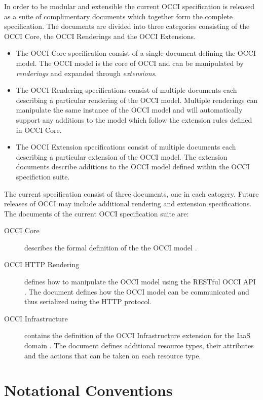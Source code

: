 \documentclass[10pt,a4paper,british]{article}
\begin{document}
In order to be modular and extensible the current OCCI specification is
released as a suite of complimentary documents which together form the complete
specification.
%
The documents are divided into three categories consisting of the OCCI Core,
the OCCI Renderings and the OCCI Extensions.
%
\begin{itemize}
\item The OCCI Core specification consist of a single document defining the
 OCCI model. The OCCI model is the core of OCCI and can be manipulated by {\em
 renderings} and expanded through {\em extensions}.
\item The OCCI Rendering specifications consist of multiple documents each
 describing a particular rendering of the OCCI model. Multiple renderings can
 manipulate the same instance of the OCCI model and will automatically support
 any additions to the model which follow the extension rules defined in OCCI
 Core.
\item The OCCI Extension specifications consist of multiple documents each
 describing a particular extension of the OCCI model. The extension documents
 describe additions to the OCCI model defined within the OCCI specifiction
 suite.
\end{itemize}
%
The current specification consist of three documents, one in each catogery.
Future releases of OCCI may include additional rendering and extension
specifications. The documents of the current OCCI specification suite are:

\begin{description}
\item[OCCI Core] describes the formal definition of the the OCCI model
\cite{occi:core}.
\item[OCCI HTTP Rendering] defines how to manipulate the OCCI model using the
RESTful OCCI API \cite{occi:http}. The document defines how the OCCI model can
be communicated and thus serialized using the HTTP protocol.
\item[OCCI Infrastructure] contains the definition of the OCCI Infrastructure
extension for the IaaS domain \cite{occi:infrastructure}. The document defines
additional resource types, their attributes and the actions that can be taken
on each resource type.
\end{description}


\section{Notational Conventions}

\end{document}
